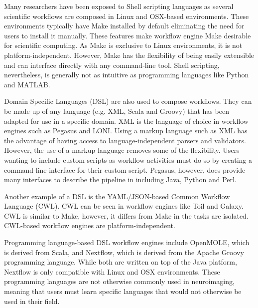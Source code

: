 \documentclass{report}
\begin{document}
            Many researchers have been exposed to Shell scripting languages as 
            several scientific workflows are composed in Linux and OSX-based 
            environments. These environments typically have Make installed by
            default eliminating the need for users to install it manually.
            These features make workflow engine Make desirable for scientific
            computing.
            As Make is exclusive to Linux environments, it is not 
            platform-independent. However, Make has the flexibility of being
            easily extensible and can interface directly with any command-line
            tool. Shell scripting, nevertheless, is generally not as intuitive
            as programming languages like Python and MATLAB.

            Domain Specific Languages (DSL) are also used to compose workflows.
            They can be made up of any language (e.g. XML, Scala and Groovy) that has been adapted for use in 
            a specific domain.
            XML is the language of choice in  
            workflow engines such as Pegasus and LONI. Using a markup language
            such as XML has the advantage of having access to 
            language-independent parsers and validators. However, the use of a 
            markup language removes some of the flexibility. Users wanting to 
            include 
            custom scripts as workflow activities must do so by creating a 
            command-line interface for their custom script. Pegasus, however,
            does provide many interfaces to describe the pipeline in including
            Java, Python and Perl.

            Another example of a DSL is the YAML/JSON-based Common Workflow
            Language (CWL). CWL can be seen in workflow engines like Toil and Galaxy.
            CWL is similar to Make, however, it differs from Make in the tasks are 
            isolated. CWL-based workflow engines are platform-independent. 

            Programming language-based DSL workflow engines include OpenMOLE, which is  
            derived from Scala, and Nextflow, which is derived from the Apache 
            Groovy programming language. While both are written on top of the 
            Java platform, Nextflow is only compatible with Linux and OSX
            environments. These programming languages are not otherwise commonly
            used in neuroimaging, meaning that users must learn specific 
            languages that would not otherwise be used in their field.
\end{document}
